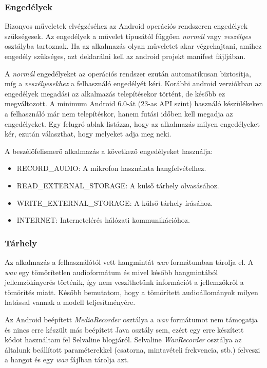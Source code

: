 \subsubsection{Engedélyek}

Bizonyos műveletek elvégzéséhez az Android operációs rendszeren engedélyek szükségesek. Az engedélyek a művelet típusától függően \emph{normál} vagy \emph{veszélyes} osztályba tartoznak. Ha az alkalmazás olyan műveletet akar végrehajtani, amihez engedély szükséges, azt deklarálni kell az android projekt manifest fájljában.

A \emph{normál} engedélyeket az operációs rendszer ezután automatikusan biztosítja, míg a \emph{veszélyesekhez} a felhasználó engedélyét kéri. Korábbi android verziókban az engedélyek megadási az alkalmazás telepítésekor történt, de később ez megváltozott. A minimum Android 6.0-át (23-as API szint) használó készülékeken a felhasználó már nem telepítéskor, hanem futási időben kell megadja az engedélyeket. Egy felugró ablak listázza, hogy az alkalmazás milyen engedélyeket kér, ezután választhat, hogy melyeket adja meg neki.

A beszélőfelismerő alkalmazás a következő engedélyeket használja:

\begin{itemize}
	\item RECORD\_AUDIO: A mikrofon használata hangfelvételhez.
	\item READ\_EXTERNAL\_STORAGE: A külső tárhely olvasásához.
	\item WRITE\_EXTERNAL\_STORAGE: A külső tárhely írásához.
	\item INTERNET: Internetelérés hálózati kommunikációhoz.
\end{itemize}

\subsubsection{Tárhely}

Az alkalmazás a felhasználótól vett hangmintát \emph{wav} formátumban tárolja el. A \emph{wav} egy tömörítetlen audioformátum és mivel később hangmintából jellemzőkinyerés történik, így nem veszíthetünk információt a jellemzőkről a tömörítés miatt. Később bemutatom, hogy a tömörített audioállományok milyen hatással vannak a modell teljesítményére.

Az Android beépített \emph{MediaRecorder} osztálya a \emph{wav} formátumot nem támogatja és nincs erre készült más beépített Java osztály sem, ezért egy erre készített kódot használtam fel Selvaline blogjáról. Selvaline \emph{WavRecorder} osztálya az általunk beállított paraméterekkel (csatorna, mintavételi frekvencia, stb.) felveszi a hangot és egy \emph{wav} fájlban tárolja azt.

